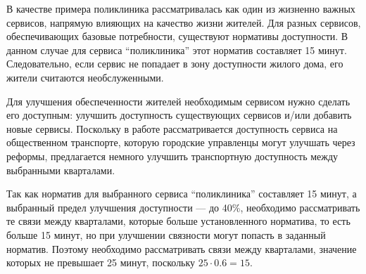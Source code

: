 В качестве примера поликлиника рассматривалась как один из жизненно важных сервисов, напрямую влияющих на качество жизни жителей. Для разных сервисов, обеспечивающих базовые потребности, существуют нормативы доступности. В данном случае для сервиса ``поликлиника'' этот норматив составляет 15 минут. Следовательно, если сервис не попадает в зону доступности жилого дома, его жители считаются необслуженными.

Для улучшения обеспеченности жителей необходимым сервисом нужно сделать его доступным: улучшить доступность существующих сервисов и/или добавить новые сервисы. Поскольку в работе рассматривается доступность сервиса на общественном транспорте, которую городские управленцы могут улучшать через реформы, предлагается немного улучшить транспортную доступность между выбранными кварталами.

Так как норматив для выбранного сервиса ``поликлиника'' составляет 15 минут, а выбранный предел улучшения доступности --- до 40\%, необходимо рассматривать те связи между кварталами, которые больше установленного норматива, то есть больше 15 минут, но при улучшении связности могут попасть в заданный норматив. Поэтому необходимо рассматривать связи между кварталами, значение которых не превышает 25 минут, поскольку $25 \cdot 0.6 = 15$.
%


